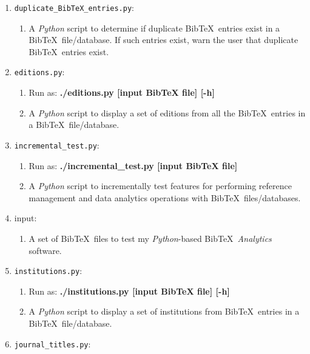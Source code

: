 \begin{enumerate}
\item {\tt duplicate\_BibTeX\_entries.py}: \vspace{-0.3cm}
	\begin{enumerate} \itemsep -2pt
	\item A {\it Python} script to determine if duplicate {\sc Bib}\TeX\ entries exist in a {\sc Bib}\TeX\ file/database. If such entries exist, warn the user that duplicate {\sc Bib}\TeX\ entries exist. 
	\end{enumerate}
\item {\tt editions.py}: \vspace{-0.3cm}
	\begin{enumerate} \itemsep -2pt
	\item Run as: {\bf ./editions.py [input BibTeX file] [-h]}
	\item A {\it Python} script to display a set of editions from all the {\sc Bib}\TeX\ entries in a {\sc Bib}\TeX\ file/database.
	\end{enumerate}
\item {\tt incremental\_test.py}: \vspace{-0.3cm}
	\begin{enumerate} \itemsep -2pt
	\item Run as: {\bf ./incremental\_test.py [input BibTeX file]}
	\item A {\it Python} script to incrementally test features for performing reference management and data analytics operations with {\sc Bib}\TeX\ files/databases.
	\end{enumerate}
\item input: \vspace{-0.3cm}
	\begin{enumerate} \itemsep -2pt
	\item A set of {\sc Bib}\TeX\ files to test my {\it Python}-based {\sc Bib}\TeX\ {\it Analytics} software.
	\end{enumerate}
\item {\tt institutions.py}: \vspace{-0.3cm}
	\begin{enumerate} \itemsep -2pt
	\item Run as: {\bf ./institutions.py [input BibTeX file] [-h]}
	\item A {\it Python} script to display a set of institutions from {\sc Bib}\TeX\ entries in a {\sc Bib}\TeX\ file/database.
	\end{enumerate}
\item {\tt journal\_titles.py}: \vspace{-0.3cm}

\end{enumerate}
